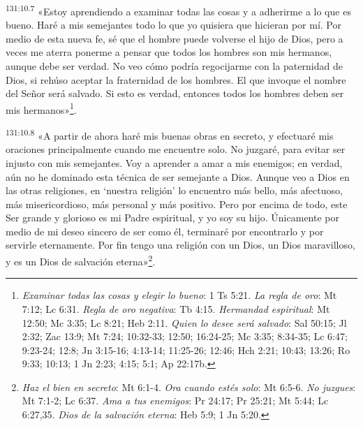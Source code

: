 \par
\textsuperscript{131:10.7} «Estoy aprendiendo a examinar todas las cosas y a adherirme a lo que es bueno. Haré a mis semejantes todo lo que yo quisiera que hicieran por mí. Por medio de esta nueva fe, sé que el hombre puede volverse el hijo de Dios, pero a veces me aterra ponerme a pensar que todos los hombres son mis hermanos, aunque debe ser verdad. No veo cómo podría regocijarme con la paternidad de Dios, si rehúso aceptar la fraternidad de los hombres. El que invoque el nombre del Señor será salvado. Si esto es verdad, entonces todos los hombres deben ser mis hermanos»\footnote{\textit{Examinar todas las cosas y elegir lo bueno}: 1 Ts 5:21. \textit{La regla de oro}: Mt 7:12; Lc 6:31. \textit{Regla de oro negativa}: Tb 4:15. \textit{Hermandad espiritual}: Mt 12:50; Mc 3:35; Lc 8:21; Heb 2:11. \textit{Quien lo desee será salvado}: Sal 50:15; Jl 2:32; Zac 13:9; Mt 7:24; 10:32-33; 12:50; 16:24-25; Mc 3:35; 8:34-35; Lc 6:47; 9:23-24; 12:8; Jn 3:15-16; 4:13-14; 11:25-26; 12:46; Hch 2:21; 10:43; 13:26; Ro 9:33; 10:13; 1 Jn 2:23; 4:15; 5:1; Ap 22:17b.}.

\par
\textsuperscript{131:10.8} «A partir de ahora haré mis buenas obras en secreto, y efectuaré mis oraciones principalmente cuando me encuentre solo. No juzgaré, para evitar ser injusto con mis semejantes. Voy a aprender a amar a mis enemigos; en verdad, aún no he dominado esta técnica de ser semejante a Dios. Aunque veo a Dios en las otras religiones, en `nuestra religión' lo encuentro más bello, más afectuoso, más misericordioso, más personal y más positivo. Pero por encima de todo, este Ser grande y glorioso es mi Padre espiritual, y yo soy su hijo. Únicamente por medio de mi deseo sincero de ser como él, terminaré por encontrarlo y por servirle eternamente. Por fin tengo una religión con un Dios, un Dios maravilloso, y es un Dios de salvación eterna»\footnote{\textit{Haz el bien en secreto}: Mt 6:1-4. \textit{Ora cuando estés solo}: Mt 6:5-6. \textit{No juzgues}: Mt 7:1-2; Lc 6:37. \textit{Ama a tus enemigos}: Pr 24:17; Pr 25:21; Mt 5:44; Lc 6:27,35. \textit{Dios de la salvación eterna}: Heb 5:9; 1 Jn 5:20.}.